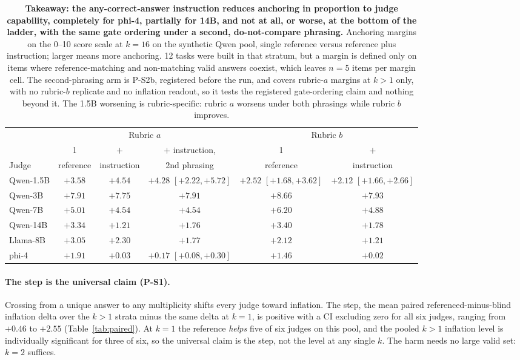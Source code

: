 \documentclass[11pt]{article}
\begin{document}
\begin{table}[tbp]
\centering
\small
\setlength{\tabcolsep}{5pt}
\begin{tabular}{lccccc}
\toprule
& \multicolumn{3}{c}{Rubric $a$} & \multicolumn{2}{c}{Rubric $b$} \\
\cmidrule(lr){2-4} \cmidrule(lr){5-6}
      & 1         & $+$         & $+$ instruction, & 1         & $+$         \\
Judge & reference & instruction & 2nd phrasing     & reference & instruction \\
\midrule
Qwen-1.5B & $+3.58$ & $+4.54$ & $+4.28$ {\scriptsize$[+2.22,+5.72]$} & $+2.52$ {\scriptsize$[+1.68,+3.62]$} & $+2.12$ {\scriptsize$[+1.66,+2.66]$} \\
Qwen-3B   & $+7.91$ & $+7.75$ & $+7.91$ & $+8.66$ & $+7.93$ \\
Qwen-7B   & $+5.01$ & $+4.54$ & $+4.54$ & $+6.20$ & $+4.88$ \\
Qwen-14B  & $+3.34$ & $+1.21$ & $+1.76$ & $+3.40$ & $+1.78$ \\
Llama-8B  & $+3.05$ & $+2.30$ & $+1.77$ & $+2.12$ & $+1.21$ \\
phi-4     & $+1.91$ & $+0.03$ & $+0.17$ {\scriptsize$[+0.08,+0.30]$} & $+1.46$ & $+0.02$ \\
\bottomrule
\end{tabular}
\caption{\textbf{Takeaway: the any-correct-answer instruction reduces anchoring in proportion to judge capability, completely for phi-4, partially for 14B, and not at all, or worse, at the bottom of the ladder, with the same gate ordering under a second, do-not-compare phrasing.}
Anchoring margins on the 0--10 score scale at $k{=}16$ on the synthetic Qwen pool, single reference versus reference plus instruction; larger means more anchoring.
12 tasks were built in that stratum, but a margin is defined only on items where reference-matching and non-matching valid answers coexist, which leaves $n{=}5$ items per margin cell.
The second-phrasing arm is P-S2b, registered before the run, and covers rubric-$a$ margins at $k{>}1$ only, with no rubric-$b$ replicate and no inflation readout, so it tests the registered gate-ordering claim and nothing beyond it.
The 1.5B worsening is rubric-specific: rubric $a$ worsens under both phrasings while rubric $b$ improves.}
\label{tab:mitig}
\end{table}

\paragraph{The step is the universal claim (P-S1).}
Crossing from a unique answer to any multiplicity shifts every judge toward inflation.
The step, the mean paired referenced-minus-blind inflation delta over the $k > 1$ strata minus the same delta at $k{=}1$, is positive with a CI excluding zero for all six judges, ranging from $+0.46$ to $+2.55$ (Table~\ref{tab:paired}).
At $k{=}1$ the reference \emph{helps} five of six judges on this pool, and the pooled $k{>}1$ inflation level is individually significant for three of six, so the universal claim is the step, not the level at any single $k$.
The harm needs no large valid set: $k{=}2$ suffices.
\end{document}
